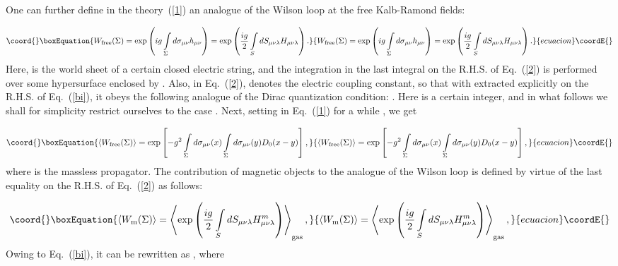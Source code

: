 \documentclass[a4paper,12pt]{article}
\begin{document}
One can further define in the theory~(\ref{1}) 
an analogue of the Wilson loop at the free Kalb-Ramond fields:

\begin{equation}\coord{}\boxEquation{
\label{2}
W_{\rm free}(\Sigma)=\exp\left(ig\int\limits_{\Sigma}^{}d\sigma_{\mu\nu}h_{\mu\nu}\right)=\exp\left(\frac{ig}{2}
\int\limits_{S}^{} dS_{\mu\nu\lambda}H_{\mu\nu\lambda}\right).
}{
W_{\rm free}(\Sigma)=\exp\left(ig\int\limits_{\Sigma}^{}d\sigma_{\mu\nu}h_{\mu\nu}\right)=\exp\left(\frac{ig}{2}
\int\limits_{S}^{} dS_{\mu\nu\lambda}H_{\mu\nu\lambda}\right).
}{ecuacion}\coordE{}\end{equation}
Here, \myHighlight{$\Sigma$}\coordHE{} is the world sheet of a certain closed electric string, and the integration in the 
last integral on the R.H.S. of Eq.~(\ref{2}) is performed over some hypersurface \coordHE{} enclosed by \myHighlight{$\Sigma$}\coordHE{}.
Also, in Eq.~(\ref{2}), \coordHE{} denotes the electric coupling constant, so that with \myHighlight{$2\pi$}\coordHE{} extracted 
explicitly on the R.H.S. of Eq.~(\ref{bi}), it obeys the following analogue of the Dirac quantization 
condition: \coordHE{}. 
Here \coordHE{} is a certain integer, and in what follows we shall for simplicity restrict
ourselves to the case \coordHE{}. Next, 
setting in Eq.~(\ref{1}) for a while \coordHE{}, we get 

\begin{equation}\coord{}\boxEquation{
\label{3}
\left<W_{\rm free}(\Sigma)\right>=\exp\left[-g^2\int\limits_{\Sigma}^{} 
d\sigma_{\mu\nu}(x)\int\limits_{\Sigma}^{} d\sigma_{\mu\nu}(y)D_0(x-y)\right],
}{
\left<W_{\rm free}(\Sigma)\right>=\exp\left[-g^2\int\limits_{\Sigma}^{} 
d\sigma_{\mu\nu}(x)\int\limits_{\Sigma}^{} d\sigma_{\mu\nu}(y)D_0(x-y)\right],
}{ecuacion}\coordE{}\end{equation}
where \coordHE{} is the massless propagator. The contribution of magnetic objects
to the analogue of the Wilson loop is defined by virtue of the last equality on the R.H.S. of Eq.~(\ref{2}) as follows:

\begin{equation}\coord{}\boxEquation{
\label{4}
\left<W_{\rm m}(\Sigma)\right>=\left<\exp\left(\frac{ig}{2}\int\limits_{S}^{} 
dS_{\mu\nu\lambda}H_{\mu\nu\lambda}^m\right)\right>_{\rm gas},
}{
\left<W_{\rm m}(\Sigma)\right>=\left<\exp\left(\frac{ig}{2}\int\limits_{S}^{} 
dS_{\mu\nu\lambda}H_{\mu\nu\lambda}^m\right)\right>_{\rm gas},
}{ecuacion}\coordE{}\end{equation}
Owing to Eq.~(\ref{bi}), it can be rewritten as 
\coordHE{}, where 
\end{document}
